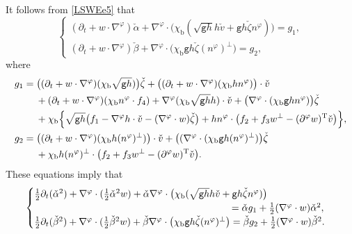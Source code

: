 \documentclass[JEP,XML,SOM,Unicode,NoFloatCountersInSection,published]{cedram}
\newcommand{\gr}{{\mathtt g}}
\newcommand{\dt}{\partial_t}
\theoremstyle{definition}
\begin{document}
It follows from \eqref{LSWEe5} that
\[
\begin{cases}
(\dt + w\cdot\nabla^\varphi)\check{\alpha} + \nabla^\varphi\cdot\bigl(\chi_\mathrm{b}(\sqrt{\gr h}h\check{v} + \gr h \check{\zeta}n^\varphi)\bigr) = g_1, \\
(\dt+w\cdot\nabla^\varphi)\check{\beta}
+ \nabla^\varphi\cdot\bigl(\chi_\mathrm{b}\gr h\check{\zeta}(n^\varphi)^\perp\bigr) = g_2,
\end{cases}
\]
where
\begin{align*}
g_1
&= \bigl((\dt+w\cdot\nabla^\varphi)(\chi_\mathrm{b}\sqrt{\gr h})\bigr)\check{\zeta} + \bigl((\dt+w\cdot\nabla^\varphi)(\chi_\mathrm{b}h n^\varphi)\bigr)\cdot\check{v} \\
&\quad\;
+ (\dt+w\cdot\nabla^\varphi)(\chi_\mathrm{b}n^\varphi\cdot f_4)
+ \nabla^\varphi(\chi_\mathrm{b}\sqrt{\gr h}h)\cdot\check{v} + \bigl(\nabla^\varphi\cdot(\chi_\mathrm{b}\gr h n^\varphi)\bigr)\check{\zeta} \\
&\quad\;
+ \chi_\mathrm{b}\Bigl\{ \sqrt{\gr h}\bigl(f_1-\nabla^\varphi h\cdot\check{v}-(\nabla^\varphi\cdot w)\check{\zeta}\bigr)
+ h n^\varphi\cdot\bigl(f_2 + f_3w^\perp-(\partial^\varphi w)^\mathrm{T}\check{v}\bigr)\Bigr\}, \\
g_2
&= \bigl((\dt+w\cdot\nabla^\varphi)(\chi_\mathrm{b}h(n^\varphi)^\perp)\bigr)\cdot\check{v} + \bigl((\nabla^\varphi\cdot(\chi_\mathrm{b}\gr h(n^\varphi)^\perp)\bigr)\check{\zeta} \\
&\quad\;
+ \chi_\mathrm{b}h(n^\varphi)^\perp\cdot\bigl(f_2 + f_3w^\perp-(\partial^\varphi w)^\mathrm{T}\check{v}\bigr).
\end{align*}
These equations imply that
\begin{equation}\label{EqCF1}
\begin{cases}
\frac12\dt(\check{\alpha}^2) + \nabla^\varphi\cdot(\frac12\check{\alpha}^2w)
+ \check{\alpha}\nabla^\varphi\cdot\bigl(\chi_\mathrm{b}(\sqrt{\gr h}h\check{v} + \gr h\check{\zeta}n^\varphi)\bigr)\\
\hphantom{\frac12\dt(\check{\beta}^2) + \nabla^\varphi\cdot(\frac12\check{\beta}^2w)
+ \check{\beta}\nabla^\varphi\cdot(\chi_\mathrm{b}\gr h\check{\zeta}(n^\varphi)^\perp)}= \check{\alpha}g_1 + \frac12(\nabla^\varphi\cdot w)\check{\alpha}^2, \\
\frac12\dt(\check{\beta}^2) + \nabla^\varphi\cdot(\frac12\check{\beta}^2w)
+ \check{\beta}\nabla^\varphi\cdot\bigl(\chi_\mathrm{b}\gr h\check{\zeta}(n^\varphi)^\perp\bigr)
= \check{\beta}g_2 + \frac12(\nabla^\varphi\cdot w)\check{\beta}^2.
\end{cases}
\end{equation}
\end{document}
